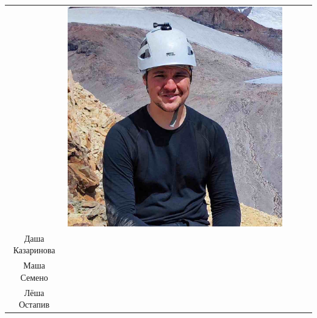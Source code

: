 \documentclass[
11pt, %
]{beamer}
\newcommand\rozhasize{0.17\textwidth}
\newcommand\namesize{0.18\textwidth}
\begin{document}
\begin{frame}
\begin{tabular}{ccccc}
\begin{minipage}{\rozhasize}
	\end{minipage} &
	\begin{minipage}{\rozhasize}
		\includegraphics[width=\textwidth]{../pics/portraits/lesha_o1}
	\end{minipage} & 
	\begin{minipage}{\namesize}
		{\tiny
		Даша Снеговская\\
		Даша Казаринова\\
		Маша Семено\\
		Лёша Остапив}
		\end{minipage} \\
	

\end{tabular}
\end{frame}
\end{document}
